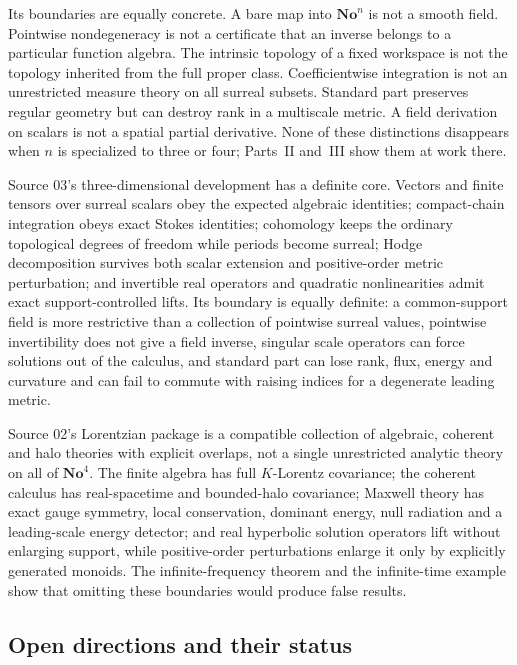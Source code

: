 \documentclass[11pt,letterpaper]{article}
\theoremstyle{definition}
\theoremstyle{remark}
\newcommand{\No}{\mathbf{No}}
\begin{document}
Its boundaries are equally concrete. A bare map into $\No^n$ is not a
smooth field. Pointwise nondegeneracy is not a certificate that an inverse
belongs to a particular function algebra. The intrinsic topology of a fixed
workspace is not the topology inherited from the full proper class.
Coefficientwise integration is not an unrestricted measure theory on all
surreal subsets. Standard part preserves regular geometry but can destroy
rank in a multiscale metric. A field derivation on scalars is not a spatial
partial derivative. None of these distinctions disappears when $n$ is
specialized to three or four; Parts~II and~III show them at work there.

Source 03's three-dimensional development has a definite core. Vectors and
finite tensors over surreal scalars obey the expected algebraic identities;
compact-chain integration obeys exact Stokes identities; cohomology keeps the
ordinary topological degrees of freedom while periods become surreal; Hodge
decomposition survives both scalar extension and positive-order metric
perturbation; and invertible real operators and quadratic nonlinearities admit
exact support-controlled lifts. Its boundary is equally definite: a
common-support field is more restrictive than a collection of pointwise surreal
values, pointwise invertibility does not give a field inverse, singular scale
operators can force solutions out of the calculus, and standard part can lose
rank, flux, energy and curvature and can fail to commute with raising indices for
a degenerate leading metric.

Source 02's Lorentzian package is a compatible collection of algebraic, coherent
and halo theories with explicit overlaps, not a single unrestricted analytic
theory on all of $\No^4$. The finite algebra has full $K$-Lorentz covariance; the
coherent calculus has real-spacetime and bounded-halo covariance; Maxwell theory
has exact gauge symmetry, local conservation, dominant energy, null radiation and
a leading-scale energy detector; and real hyperbolic solution operators lift
without enlarging support, while positive-order perturbations enlarge it only by
explicitly generated monoids. The infinite-frequency theorem and the
infinite-time example show that omitting these boundaries would produce false
results.

\subsection{Open directions and their status}\label{vtf:subsec:open}
\end{document}
